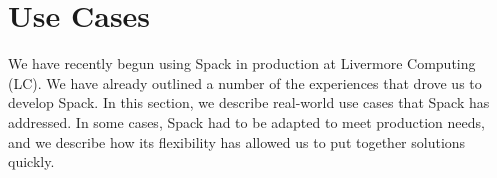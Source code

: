 
\section{Use Cases}
\label{sec:usecases}

We have recently begun using Spack in production at
Livermore Computing (LC).  We have already outlined a number of the
experiences that drove us to develop Spack.
In this section, we describe real-world use cases that Spack
has addressed.  In some cases, Spack had to be
adapted to meet production needs, and we describe how its
flexibility has allowed us to put together solutions quickly.





